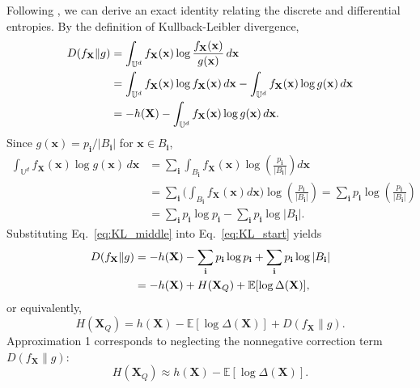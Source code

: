\documentclass[12pt,onecolumn, margin=1in]{IEEEtran}
\begin{document}
Following \cite{kostina_data_2017}, we can derive an exact identity relating the discrete and differential entropies. By the definition of Kullback-Leibler divergence,
\begin{align}
D(f_{\mathbf{X}}\|g)
&=
\int_{\mathbb{U}^d}
f_{\mathbf{X}}(\mathbf{x})
\log\frac{f_{\mathbf{X}}(\mathbf{x})}{g(\mathbf{x})}
\,d\mathbf{x}
\notag\\
&=
\int_{\mathbb{U}^d}
f_{\mathbf{X}}(\mathbf{x})\log f_{\mathbf{X}}(\mathbf{x})
\,d\mathbf{x}
-
\int_{\mathbb{U}^d}
f_{\mathbf{X}}(\mathbf{x})\log g(\mathbf{x})
\,d\mathbf{x}
\notag\\
&=
-h(\mathbf{X})
-
\int_{\mathbb{U}^d}
f_{\mathbf{X}}(\mathbf{x})\log g(\mathbf{x})
\,d\mathbf{x}.
\label{eq:KL_start}
\end{align}
Since $g(\mathbf{x}) = p_{\mathbf{i}}/|B_{\mathbf{i}}|$ for $\mathbf{x}\in B_{\mathbf{i}}$,
\begin{align}
\int_{\mathbb{U}^d}
f_{\mathbf{X}}(\mathbf{x})\log g(\mathbf{x})
\,d\mathbf{x}
&=
\sum_{\mathbf{i}}
\int_{B_{\mathbf{i}}}
f_{\mathbf{X}}(\mathbf{x})
\log\left(\frac{p_{\mathbf{i}}}{|B_{\mathbf{i}}|}\right)
d\mathbf{x}\\
&=
\sum_{\mathbf{i}}
 \bigg(
\int_{B_{\mathbf{i}}}
f_{\mathbf{X}}(\mathbf{x}) d\mathbf{x}\bigg)
\log\left(\frac{p_{\mathbf{i}}}{|B_{\mathbf{i}}|}\right)
=
\sum_{\mathbf{i}}
p_{\mathbf{i}}
\log\left(\frac{p_{\mathbf{i}}}{|B_{\mathbf{i}}|}\right)\\
&=
\sum_{\mathbf{i}} p_{\mathbf{i}}\log p_{\mathbf{i}}
-
\sum_{\mathbf{i}} p_{\mathbf{i}}\log |B_{\mathbf{i}}|.
\label{eq:KL_middle}
\end{align}
Substituting Eq.~\eqref{eq:KL_middle} into Eq.~\eqref{eq:KL_start} yields
\begin{align}
D(f_{\mathbf{X}}\|g)
&=
-h(\mathbf{X})
-
\sum_{\mathbf{i}} p_{\mathbf{i}}\log p_{\mathbf{i}}
+
\sum_{\mathbf{i}} p_{\mathbf{i}}\log |B_{\mathbf{i}}|
\notag\\
&=
-h(\mathbf{X})
+
H(\mathbf{X}_Q)
+
\mathbb{E}[\log \Delta(\mathbf{X})],
\end{align}
or equivalently,
\begin{equation}
H(\mathbf{X}_Q)
=
h(\mathbf{X})
-
\mathbb{E}[\log \Delta(\mathbf{X})]
+
D(f_{\mathbf{X}}\|g).
\label{eq:exact_identity}
\end{equation}
Approximation 1 corresponds to neglecting the nonnegative correction term $D(f_{\mathbf{X}}\|g)$:
\begin{equation}
H(\mathbf{X}_Q)
\approx
h(\mathbf{X})
-
\mathbb{E}[\log \Delta(\mathbf{X})].
\label{eq:approx1_clean}
\end{equation}
\end{document}

